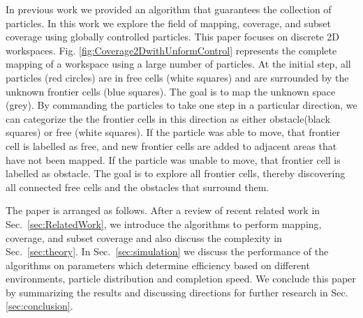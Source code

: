 In previous work \cite{mahadev2016collecting} we provided an algorithm that guarantees the collection of particles.
 In this work we explore the field of mapping, coverage, and subset coverage using globally controlled particles. 
 This paper focuses on discrete 2D workspaces.
Fig. \ref{fig:Coverage2DwithUnformControl} represents the complete mapping of a workspace using a large number of particles.  
At the initial step, all  particles (red circles) are in free cells (white squares) and are surrounded by the unknown frontier cells (blue squares). The goal is to map the unknown space (grey).
By commanding the particles to take one step in a particular direction, we can categorize the the frontier cells in this direction as either obstacle(black squares) or free (white squares).
 If the particle was able to move, that frontier cell is labelled as free, and new frontier cells are added to adjacent areas that have not been mapped.
 If the particle was unable to move, that frontier cell is labelled as obstacle.
The goal is to explore all  frontier cells, thereby discovering all connected free cells and the obstacles that surround them. 

The paper is arranged as follows. 
After a review of recent related work in Sec.~\ref{sec:RelatedWork}, we introduce the algorithms to perform mapping, coverage, and subset coverage and also discuss the complexity in Sec.~\ref{sec:theory}.
 In Sec.~\ref{sec:simulation} we discuss the performance of the algorithms on parameters which determine efficiency based on different environments, particle distribution and completion speed. We conclude this paper by summarizing the results and discussing
 directions for further research in Sec.  \ref{sec:conclusion}.